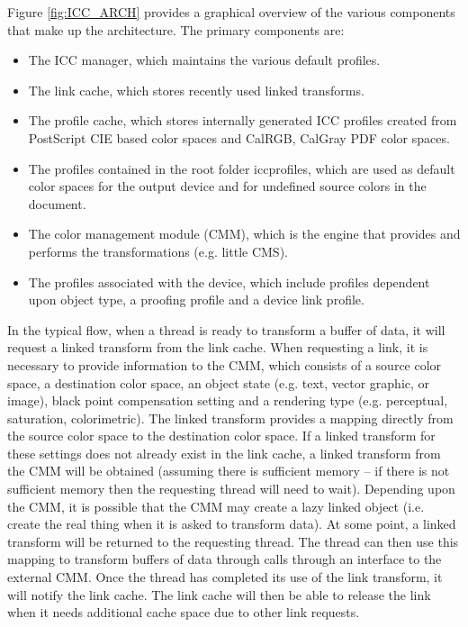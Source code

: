 \documentclass[12pt,notitlepage]{article}
\begin{document}
Figure \ref{fig:ICC_ARCH} provides a graphical overview of the various components that make up the architecture.  The primary components are:
\begin{itemize}
\item  The ICC manager, which maintains the various default profiles.
\item The link cache, which stores recently used linked transforms.
\item The profile cache, which stores internally generated ICC profiles created from PostScript CIE based color spaces and CalRGB, CalGray PDF color spaces.
\item The profiles contained in the root folder iccprofiles, which are used as default color spaces for the output device and for undefined source colors in the document.
\item The color management module (CMM), which is the engine that provides and performs the transformations (e.g. little CMS).
\item The profiles associated with the device, which include profiles dependent upon object type, a proofing profile and a device link profile.
\end{itemize}
In the typical flow, when a thread is ready to transform a buffer of data, it will request a linked transform from the link cache. When requesting a link, it is necessary to provide information to the CMM, which consists of a source color space, a destination color space, an object state (e.g. text, vector graphic, or image), black point compensation setting and a rendering type (e.g. perceptual, saturation, colorimetric).  The linked transform provides a mapping directly from the source color space to the destination color space. If a linked transform for these settings does not already exist in the link cache, a linked transform from the CMM will be obtained (assuming there is sufficient memory -- if there is not sufficient memory then the requesting thread will need to wait).  Depending upon the CMM, it is possible that the CMM may create a lazy linked object (i.e. create the real thing when it is asked to transform data).  At some point, a linked transform will be returned to the requesting thread.  The thread can then use this mapping to transform buffers of data through calls through an interface to the external CMM.  Once the thread has completed its use of the link transform, it will notify the link cache.  The link cache will then be able to release the link when it needs additional cache space due to other link requests.
\end{document}
